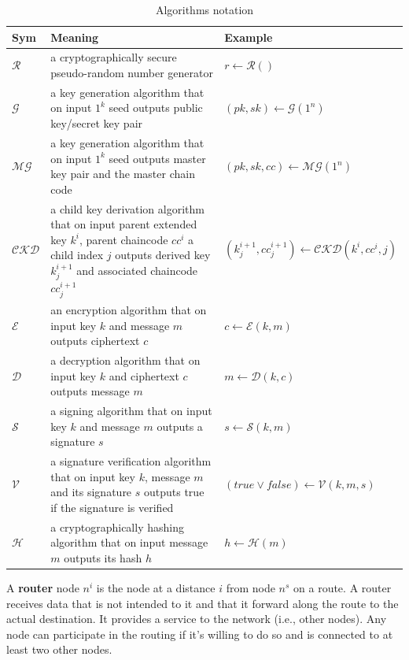 \documentclass[12pt,oneside]{wlscirep}
\begin{document}
\begin{table}[ht]
\begin{tabular}{@{}lp{10cm}l@{}}
\toprule
Sym     & Meaning &  Example                          \\ \midrule
$\mathcal{R}$ & a cryptographically secure pseudo-random number generator & $r \gets \mathcal{R}()$ \\
$\mathcal{G}$ & a key generation algorithm that on input $1^k$ seed outputs public key/secret key pair& $(pk,sk) \gets \mathcal{G}(1^n)$ \\ 
$\mathcal{MG}$ & a key generation algorithm that  on input $1^k$ seed outputs master key pair and the master chain code & $(pk,sk,cc) \gets \mathcal{MG}(1^n)$ \\
$\mathcal{CKD}$ & a child key derivation algorithm that on input parent extended key $k^i$, parent chaincode $cc^i$ a child index $j$ outputs derived key $k_j^{i+1}$ and associated chaincode $cc_j^{i+1}$ & $(k_j^{i+1}, cc_j^{i+1}) \gets \mathcal{CKD}(k^i, cc^i, j)$ \\
$\mathcal{E}$ & an encryption algorithm that on input key $k$ and message $m$ outputs ciphertext $c$ & $c \gets \mathcal{E}(k, m)$ \\
$\mathcal{D}$ & a decryption algorithm that on input key $k$ and ciphertext $c$ outputs message $m$ & $m \gets \mathcal{D}(k, c)$ \\
$\mathcal{S}$ & a signing algorithm that on input key $k$ and message $m$ outputs a signature $s$ & $s \gets \mathcal{S}(k, m)$ \\
$\mathcal{V}$ & a signature verification algorithm that on input key $k$, message $m$ and its signature $s$ outputs true if the signature is verified & $(true \lor false) \gets \mathcal{V}(k, m, s)$ \\
$\mathcal{H}$ & a cryptographically hashing algorithm that on input message $m$ outputs its hash $h$ & $h \gets \mathcal{H}(m)$ \\
\bottomrule
\end{tabular}
\caption{Algorithms notation}
\label{AlgorithmNotation}
\end{table}
A \textbf{router} node $n^i$ is the node at a distance $i$ from node $n^s$ on a route. A router receives data that is not intended to it and that it forward along the route to the actual destination. It provides a service to the network (i.e., other nodes). Any node can participate in the routing if it's willing to do so and is connected to at least two other nodes.\par
\end{document}
